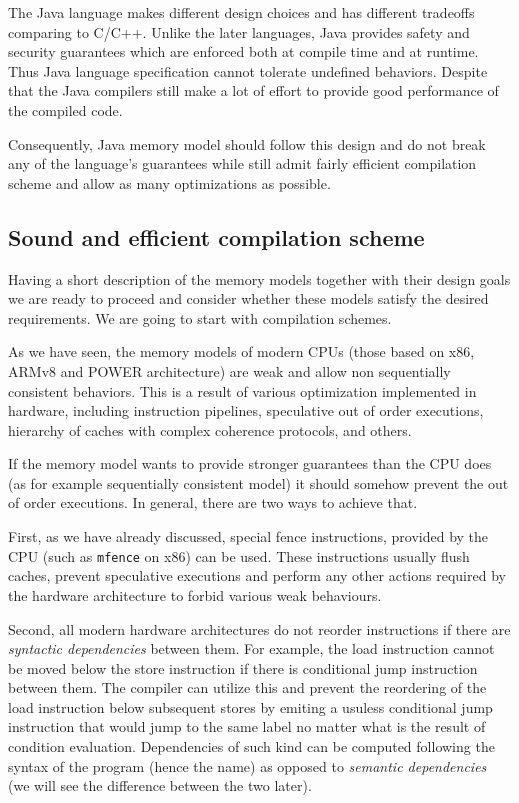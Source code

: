 \documentclass[a4paper,twoside,11pt]{article}
\numberwithin{equation}{section}
\begin{document}
The Java language makes different design choices and has different tradeoffs comparing to C/C++.
Unlike the later languages, Java provides safety and security guarantees
which are enforced both at compile time and at runtime.  
Thus Java language specification cannot tolerate undefined behaviors.
Despite that the Java compilers still make a lot of effort 
to provide good performance of the compiled code.

Consequently, Java memory model should follow this design 
and do not break any of the language's guarantees
while still admit fairly efficient compilation scheme
and allow as many optimizations as possible.

\subsection{Sound and efficient compilation scheme}

Having a short description of the memory models 
together with their design goals we are ready to proceed 
and consider whether these models satisfy the desired requirements.
We are going to start with compilation schemes.

As we have seen, the memory models of modern CPUs 
(those based on x86, ARMv8 and POWER architecture)
are weak and allow non sequentially consistent behaviors.
This is a result of various optimization implemented in hardware,
including instruction pipelines, speculative out of order executions, 
hierarchy of caches with complex coherence protocols, and others.

If the memory model wants to provide stronger guarantees 
than the CPU does (as for example sequentially consistent model)
it should somehow prevent the out of order executions.
In general, there are two ways to achieve that. 

First, as we have already discussed, special fence instructions,
provided by the CPU (such as \texttt{mfence} on x86) can be used.
These instructions usually flush caches, prevent speculative executions
and perform any other actions required by the hardware architecture
to forbid various weak behaviours.

Second, all modern hardware architectures do not reorder instructions 
if there are \emph{syntactic dependencies} between them. 
For example, the load instruction cannot be moved below 
the store instruction if there is conditional jump instruction between them.
The compiler can utilize this and prevent 
the reordering of the load instruction below subsequent stores
by emiting a usuless conditional jump instruction that would jump 
to the same label no matter what is the result of condition evaluation.
Dependencies of such kind can be computed following the 
syntax of the program (hence the name) as opposed 
to \emph{semantic dependencies} 
(we will see the difference between the two later).
\end{document}
